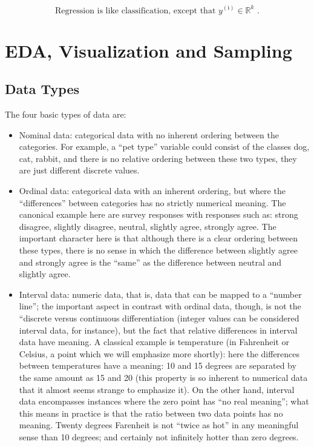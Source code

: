 \documentclass[openany]{book}
\begin{document}
\begin{equation}
\text { Regression is like classification, except that } y^{(\mathfrak{i})} \in \mathbb{R}^{k} \text { . }
\end{equation}
    

\chapter{EDA, Visualization and Sampling}

\section{Data Types}


The four basic types of data are:

\begin{itemize}
    \item Nominal data: categorical data with no inherent ordering between the categories. For example, a “pet type” variable could consist of the classes {dog, cat, rabbit}, and there is no relative ordering between these two types, they are just different discrete values.

    \item Ordinal data: categorical data with an inherent ordering, but where the “differences” between categories has no strictly numerical meaning. The canonical example here are survey responses with responses such as: {strong disagree, slightly disagree, neutral, slightly agree, strongly agree}. The important character here is that although there is a clear ordering between these types, there is no sense in which the difference between slightly agree and strongly agree is the “same” as the difference between neutral and slightly agree.

    \item Interval data: numeric data, that is, data that can be mapped to a “number line”; the important aspect in contrast with ordinal data, though, is not the “discrete versus continuous differentiation (integer values can be considered interval data, for instance), but the fact that relative differences in interval data have meaning. A classical example is temperature (in Fahrenheit or Celsius, a point which we will emphasize more shortly): here the differences between temperatures have a meaning: 10 and 15 degrees are separated by the same amount as 15 and 20 (this property is so inherent to numerical data that it almost seems strange to emphasize it). On the other hand, interval data encompasses instances where the zero point has “no real meaning”; what this means in practice is that the ratio between two data points has no meaning. Twenty degrees Farenheit is not “twice as hot” in any meaningful sense than 10 degrees; and certainly not infinitely hotter than zero degrees.


\end{itemize}
\end{document}
